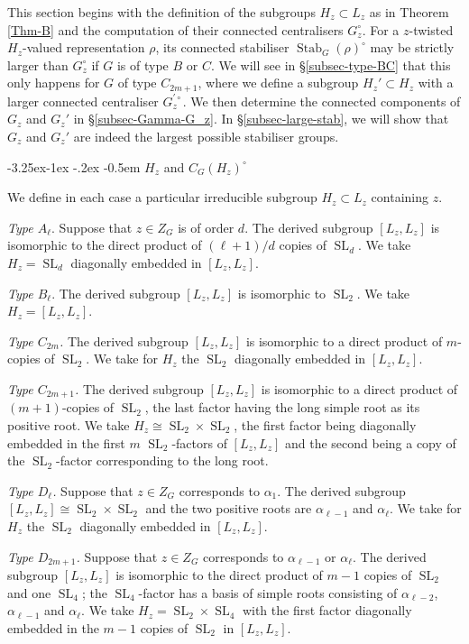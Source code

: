 \documentclass[11pt,oneside,dvipsnames]{amsart}
\makeatletter
\renewcommand\subsection{\@startsection{subsection}{3}{\z@}%
                                     {-3.25ex\@plus -1ex \@minus -.2ex}%
                                     {-0.5em}%
                                     {\normalfont\normalsize\bfseries}}
\theoremstyle{plain}
\theoremstyle{definition}
\theoremstyle{named}
\DeclareMathOperator{\SL}{SL}
\DeclareMathOperator{\Stab}{Stab}
\makeatother
\begin{document}
This section begins with the definition of the subgroups $H_z\subset L_z$ as in Theorem \ref{Thm-B} and the computation of their connected centralisers $G_z^{\circ}$. For a $z$-twisted $H_z$-valued representation $\rho$, its connected stabiliser $\Stab_G(\rho)^{\circ}$ may be strictly larger than $G_z^{\circ}$ if $G$ is of type $B$ or $C$. We will see in \S \ref{subsec-type-BC} that this only happens for $G$ of type $C_{2m+1}$, where we define a subgroup $H_z'\subset H_z$ with a larger connected centraliser $G_z^{\prime\circ}$. We then determine the connected components of $G_z$ and $G_z'$ in \S \ref{subsec-Gamma-G_z}. In \S \ref{subsec-large-stab}, we will show that $G_z$ and $G_z'$ are indeed the largest possible stabiliser groups.

\subsection{$H_z$ and $C_G(H_z)^{\circ}$}\label{subsec-Defn-H_z}\hfill

We define in each case a particular irreducible subgroup $H_z\subset L_z$ containing $z$. 

\textit{Type $A_{\ell}$}. Suppose that $z\in Z_G$ is of order $d$. The derived subgroup $[L_z,L_z]$ is isomorphic to the direct product of $(\ell+1)/d$ copies of $\SL_d$. We take $H_z=\SL_d$ diagonally embedded in $[L_z,L_z]$.

\textit{Type $B_{\ell}$}. The derived subgroup $[L_z,L_z]$ is isomorphic to $\SL_2$. We take $H_z=[L_z,L_z]$.

\textit{Type $C_{2m}$.} The derived subgroup $[L_z,L_z]$ is isomorphic to a direct product of $m$-copies of $\SL_2$. We take for $H_z$ the $\SL_2$ diagonally embedded in $[L_z,L_z]$. 

\textit{Type $C_{2m+1}$.} The derived subgroup $[L_z,L_z]$ is isomorphic to a direct product of $(m+1)$-copies of $\SL_2$, the last factor having the long simple root as its positive root. We take $H_z\cong\SL_2\times\SL_2$, the first factor being diagonally embedded in the first $m$ $\SL_2$-factors of $[L_z,L_z]$ and the second being a copy of the $\SL_2$-factor corresponding to the long root.  

\textit{Type $D_{\ell}$.} Suppose that $z\in Z_G$ corresponds to $\alpha_1$. The derived subgroup $[L_z,L_z]\cong\SL_2\times\SL_2$ and the two positive roots are $\alpha_{\ell-1}$ and $\alpha_{\ell}$. We take for $H_z$ the $\SL_2$ diagonally embedded in $[L_z,L_z]$.

\textit{Type $D_{2m+1}$.} Suppose that $z\in Z_G$ corresponds to $\alpha_{\ell-1}$ or $\alpha_{\ell}$. The derived subgroup $[L_z,L_z]$ is isomorphic to the direct product of $m-1$ copies of $\SL_2$ and one $\SL_4$; the $\SL_4$-factor has a basis of simple roots consisting of $\alpha_{\ell-2}$, $\alpha_{\ell-1}$ and $\alpha_{\ell}$. We take $H_z=\SL_2\times\SL_4$ with the first factor diagonally embedded in the $m-1$ copies of $\SL_2$ in $[L_z,L_z]$.
\end{document}

